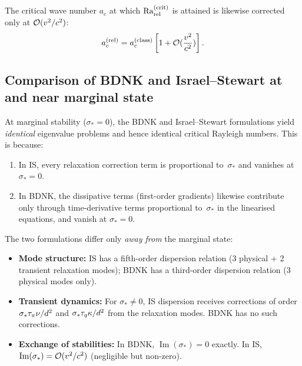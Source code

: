 The critical wave number $a_c$ at which $\mathrm{Ra}_{\mathrm{rel}}^{(\mathrm{crit})}$ is
attained is likewise corrected only at $\mathcal{O}(v^2/c^2)$:
\begin{equation}
\label{eq:rel-ac}
a_c^{(\mathrm{rel})}
= a_c^{(\mathrm{class})}
  \left[1 + \mathcal{O}(\frac{v^2}{c^2})\right].
\end{equation}

\subsection{Comparison of BDNK and Israel--Stewart at and near marginal state}
\label{sec:rel-12c}

At marginal stability ($\sigma_* = 0$), the BDNK and Israel--Stewart
formulations yield \emph{identical} eigenvalue problems and hence identical
critical Rayleigh numbers.  This is because:
\begin{enumerate}
\item In IS, every relaxation correction term is proportional
  to~$\sigma_*$ and vanishes at $\sigma_* = 0$.
\item In BDNK, the dissipative terms (first-order gradients) likewise
  contribute only through time-derivative terms proportional to~$\sigma_*$
  in the linearised equations, and vanish at $\sigma_* = 0$.
\end{enumerate}
The two formulations differ only \emph{away from} the marginal state:
\begin{itemize}
\item \textbf{Mode structure:} IS has a fifth-order dispersion relation
  (3 physical + 2 transient relaxation modes); BDNK has a third-order
  dispersion relation (3 physical modes only).
\item \textbf{Transient dynamics:} For $\sigma_* \ne 0$, IS dispersion
  receives corrections of order $\sigma_* \tau_{\pi}\nu/d^2$ and
  $\sigma_* \tau_{q}\kappa/d^2$ from the relaxation modes.  BDNK has no
  such corrections.
\item \textbf{Exchange of stabilities:} In BDNK,
  $\operatorname{Im}(\sigma_*) = 0$ exactly.  In IS,
  $\operatorname{Im}(\sigma_*) = \mathcal{O}(v^2/c^2)$ (negligible but
  non-zero).
\end{itemize}

